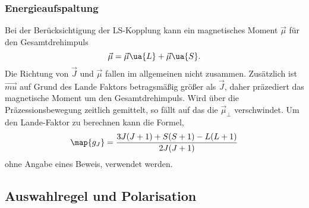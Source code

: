 \subsubsection{Energieaufspaltung}
Bei der Berücksichtigung der LS-Kopplung kann ein magnetisches Moment $\vec{\mu}$ für den Gesamtdrehimpuls
\begin{equation*}
  \vec{\mu}=\vec{\mu}\ua{L} + \vec{\mu}\ua{S}.
\end{equation*}
Die Richtung von $\vec{J}$ und $\vec{\mu}$ fallen im allgemeinen nicht zusammen. Zusätzlich ist
$\vec{mu}$ auf Grund des Lande Faktors betragsmäßig größer als $\vec{J}$, daher präzediert das magnetische Moment um den Gesamtdrehimpuls.
Wird über die Präzessionsbewegung zeitlich gemittelt, so fällt auf das die $\vec{\mu}_{\perp}$ verschwindet.
Um den Lande-Faktor zu berechnen kann die Formel,
\begin{equation}
  \label{eq:lande_faktor}
  \map{g_J}=\frac{3J(J+1)+S(S+1)-L(L+1)}{2J(J+1)}
\end{equation}
ohne Angabe eines Beweis, verwendet werden.




\subsection{Auswahlregel und Polarisation}
